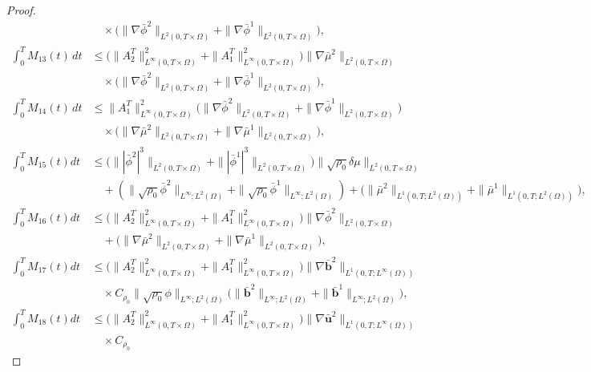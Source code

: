 \documentclass[11pt]{article}
\numberwithin{equation}{section}
\begin{document}
\begin{proof}
\begin{align*}
&\quad \times \big( \| \nabla \bar{\phi}^2 \|_{L^2(0,T \times \Omega)} + \| \nabla \bar{\phi}^1 \|_{L^2(0,T \times \Omega)} \big),\\
\int_{0}^{T} M_{13}(t) \, dt &\leq \big( \| A_2^T \|_{L^{\infty}(0,T \times \Omega)}^2 + \| A_1^T \|_{L^{\infty}(0,T \times \Omega)}^2 \big) \| \nabla \bar{\mu}^2 \|_{L^2(0,T \times \Omega)}\\&\quad\times \big( \| \nabla \bar{\phi}^2 \|_{L^2(0,T \times \Omega)} + \| \nabla \bar{\phi}^1 \|_{L^2(0,T \times \Omega)} \big), \\
\int_{0}^{T} M_{14}(t) \, dt &\leq \| A_1^T \|_{L^{\infty}(0,T \times \Omega)}^2 \big( \| \nabla \bar{\phi}^2 \|_{L^2(0,T \times \Omega)} + \| \nabla \bar{\phi}^1 \|_{L^2(0,T \times \Omega)} \big)\\&\quad\times \big( \| \nabla \bar{\mu}^2 \|_{L^2(0,T \times \Omega)} + \| \nabla \bar{\mu}^1 \|_{L^2(0,T \times \Omega)} \big), \\
\int_{0}^{T} M_{15}(t) dt &\leq \big( \| |\bar{\phi}^2|^3 \|_{L^2(0,T \times \Omega)} + \| |\bar{\phi}^1|^3 \|_{L^2(0,T \times \Omega)} \big) \| \sqrt{\rho_0} \delta \mu \|_{L^2(0,T \times \Omega)} \\
&\quad + (\| \sqrt{\rho_0}\bar{\phi}^2 \|_{L^{\infty}; L^2(\Omega)}+\| \sqrt{\rho_0}\bar{\phi}^1 \|_{L^{\infty}; L^2(\Omega)})+ \big( \| \bar{\mu}^2 \|_{L^1(0,T; L^2(\Omega))} + \| \bar{\mu}^1 \|_{L^1(0,T; L^2(\Omega))} \big), \\
\int_{0}^{T} M_{16}(t) dt &\leq \big( \| A_2^T \|_{L^{\infty}(0,T \times \Omega)}^2 + \| A_1^T \|_{L^{\infty}(0,T \times \Omega)}^2 \big)
\| \nabla \bar{\phi}^2 \|_{L^2(0,T \times \Omega)} \\&\quad+ \big(\| \nabla \bar{\mu}^2 \|_{L^2(0,T \times \Omega)}+\| \nabla \bar{\mu}^1 \|_{L^2(0,T \times \Omega)} \big),\\
\int_{0}^{T} M_{17}(t) dt &\leq \big( \| A_2^T \|_{L^{\infty}(0,T \times \Omega)}^2 + \| A_1^T \|_{L^{\infty}(0,T \times \Omega)}^2 \big)
\| \nabla \bar{\mathbf{b}}^2 \|_{L^1(0,T; L^\infty(\Omega))} \\&\quad\times C_{\rho_0}
\| \sqrt{\rho_0} \phi \|_{L^{\infty}; L^2(\Omega)}
\big(\|\bar{\mathbf{b}}^2 \|_{L^{\infty}; L^2(\Omega)}+\|\bar{\mathbf{b}}^1 \|_{L^{\infty}; L^2(\Omega)} \big),\\
\int_{0}^{T} M_{18}(t) dt &\leq \big(\| A_2^T \|_{L^{\infty}(0,T \times \Omega)}^2 + \| A_1^T \|_{L^{\infty}(0,T \times \Omega)}^2 \big)
\| \nabla \bar{\mathbf{u}}^2 \|_{L^1(0,T; L^\infty(\Omega))} \\&\quad\times C_{\rho_0}

\end{align*}
\end{proof}
\end{document}
